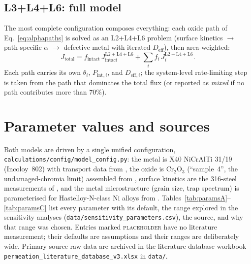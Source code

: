 \documentclass[11pt,a4paper]{article}
\newcommand{\Pint}{P_{\mathrm{int}}}
\newcommand{\Deff}{D_{\mathrm{eff}}}
\newcommand{\code}[1]{\texttt{#1}}
\begin{document}
\subsection{L3+L4+L6: full model}

The most complete configuration composes everything: each oxide path of
Eq.~\eqref{eq:alphapaths} is solved as an L2+L4+L6 problem (surface kinetics
$\rightarrow$ path-specific $\alpha$ $\rightarrow$ defective metal with
iterated $\Deff$), then area-weighted:
\begin{equation}
  J_{\mathrm{total}} = f_{\mathrm{intact}}\,J_{\mathrm{intact}}^{\mathrm{L2+L4+L6}}
                     + \sum_i f_i\, J_i^{\mathrm{L2+L4+L6}}.
  \label{eq:L346}
\end{equation}
Each path carries its own $\theta_i$, $\Pint{}_{,i}$, and $\Deff{}_{,i}$; the
system-level rate-limiting step is taken from the path that dominates the
total flux (or reported as \emph{mixed} if no path contributes more than
70\%).

\section{Parameter values and sources}
\label{sec:parameters}

Both models are driven by a single unified configuration,
\code{calculations/config/model\_config.py}: the metal is X40 NiCrAlTi 31/19
(Incoloy~802) with transport data from \citet{schmidt1985}, the oxide is
$\mathrm{Cr_2O_3}$ (``sample~4'', the undamaged-chromia limit) assembled from
\citet{nemanic2023,stover1986,chen2011}, surface kinetics are the 316-steel
measurements of \citet{grant1988}, and the metal microstructure (grain size,
trap spectrum) is parameterised for Hastelloy-N-class Ni alloys from
\citet{zhu2021,lu2022,young1997}. Tables~\ref{tab:paramsA}--\ref{tab:paramsC}
list every parameter with its default, the range explored in the sensitivity
analyses (\code{data/sensitivity\_parameters.csv}), the source, and why that
range was chosen. Entries marked \textsc{placeholder} have no literature
measurement; their defaults are assumptions and their ranges are deliberately
wide. Primary-source raw data are archived in the literature-database
workbook \code{permeation\_literature\_database\_v3.xlsx} in \code{data/}.
\end{document}
